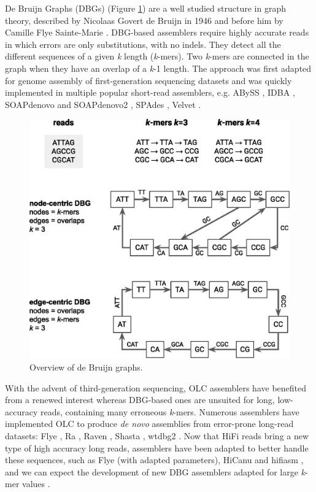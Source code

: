 De Bruijn Graphs (DBGs) (Figure \ref{fig:dbg}) are a well studied structure in graph theory, described by Nicolaas Govert de Bruijn in 1946 \cite{dbg} and before him by Camille Flye Sainte-Marie \cite{flyesaintemarie}. DBG-based assemblers require highly accurate reads in which errors are only substitutions, with no indels. They detect all the different sequences of a given \textit{k} length (\textit{k}-mers). Two \textit{k}-mers are connected in the graph when they have an overlap of a \textit{k}-1 length. The approach was first adapted for genome assembly of first-generation sequencing datasets \cite{Compeau2011} and was quickly implemented in multiple popular short-read assemblers, e.g. ABySS \cite{abyss, abyss2}, IDBA \cite{idba}, SOAPdenovo \cite{soapdenovo} and SOAPdenovo2 \cite{soapdenovo2}, SPAdes \cite{spades}, Velvet \cite{velvet}. \\

\begin{figure}
    \centering
    \includegraphics[width=\textwidth]{fig/review_de_bruijn_graph.eps}
    \caption{Overview of de Bruijn graphs.}
    \label{fig:dbg}
\end{figure}

With the advent of third-generation sequencing, OLC assemblers have benefited from a renewed interest whereas DBG-based ones are unsuited for long, low-accuracy reads, containing many erroneous \textit{k}-mers. Numerous assemblers have implemented OLC to produce \textit{de novo} assemblies from error-prone long-read datasets: Flye \cite{flye}, Ra \cite{ra}, Raven \cite{raven}, Shasta \cite{shasta}, wtdbg2 \cite{wtdbg2}. Now that HiFi reads bring a new type of high accuracy long reads, assemblers have been adapted to better handle these sequences, such as Flye (with adapted parameters), HiCanu \cite{hicanu} and hifiasm \cite{hifiasm}, and we can expect the development of new DBG assemblers adapted for large \textit{k}-mer values \cite{bankevich2020}. \\

